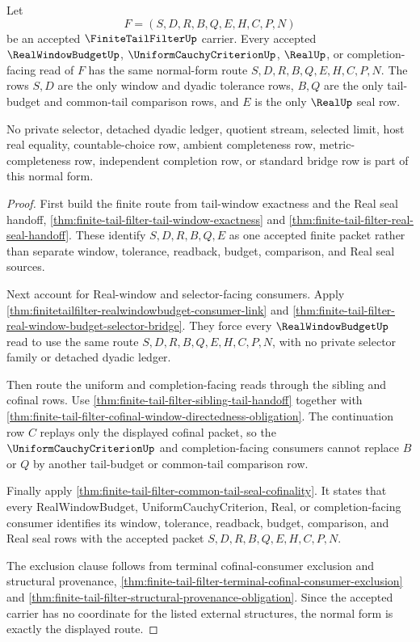 \begin{theorem}
\label{thm:finitetailfilter-cofinal-window-budget-normal-form}
Let
$$
F=(S,D,R,B,Q,E,H,C,P,N)
$$
be an accepted $\FiniteTailFilterUp$ carrier. Every accepted $\RealWindowBudgetUp$, $\UniformCauchyCriterionUp$, $\RealUp$, or completion-facing read of $F$ has the same normal-form route $S,D,R,B,Q,E,H,C,P,N$. The rows $S,D$ are the only window and dyadic tolerance rows, $B,Q$ are the only tail-budget and common-tail comparison rows, and $E$ is the only $\RealUp$ seal row.

No private selector, detached dyadic ledger, quotient stream, selected limit, host real equality, countable-choice row, ambient completeness row, metric-completeness row, independent completion row, or standard bridge row is part of this normal form.
\end{theorem}
\begin{proof}
First build the finite route from tail-window exactness and the Real seal handoff, \autoref{thm:finite-tail-filter-tail-window-exactness} and \autoref{thm:finite-tail-filter-real-seal-handoff}. These identify $S,D,R,B,Q,E$ as one accepted finite packet rather than separate window, tolerance, readback, budget, comparison, and Real seal sources.

Next account for Real-window and selector-facing consumers. Apply \autoref{thm:finitetailfilter-realwindowbudget-consumer-link} and \autoref{thm:finite-tail-filter-real-window-budget-selector-bridge}. They force every $\RealWindowBudgetUp$ read to use the same route $S,D,R,B,Q,E,H,C,P,N$, with no private selector family or detached dyadic ledger.

Then route the uniform and completion-facing reads through the sibling and cofinal rows. Use \autoref{thm:finite-tail-filter-sibling-tail-handoff} together with \autoref{thm:finite-tail-filter-cofinal-window-directedness-obligation}. The continuation row $C$ replays only the displayed cofinal packet, so the $\UniformCauchyCriterionUp$ and completion-facing consumers cannot replace $B$ or $Q$ by another tail-budget or common-tail comparison row.

Finally apply \autoref{thm:finite-tail-filter-common-tail-seal-cofinality}. It states that every RealWindowBudget, UniformCauchyCriterion, Real, or completion-facing consumer identifies its window, tolerance, readback, budget, comparison, and Real seal rows with the accepted packet $S,D,R,B,Q,E,H,C,P,N$.

The exclusion clause follows from terminal cofinal-consumer exclusion and structural provenance, \autoref{thm:finite-tail-filter-terminal-cofinal-consumer-exclusion} and \autoref{thm:finite-tail-filter-structural-provenance-obligation}. Since the accepted carrier has no coordinate for the listed external structures, the normal form is exactly the displayed route.
\end{proof}

